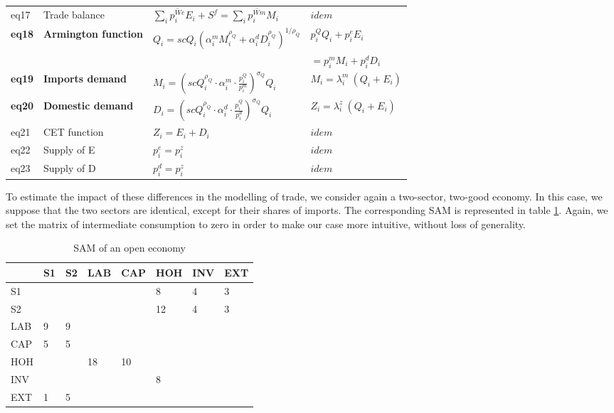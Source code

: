 \begin{table}[!h]
\begin{tabular}{llll}
		eq17 & Trade balance & $\sum_i \overline{p^{We}_i} E_i + S^f = \sum_i \overline{p^{Wm}_i} M_i$ & $idem$ \\
		\textbf{eq18} & \textbf{Armington function} & $Q_i = scQ_i (\alpha^m_i M_i^{\rho_Q} + \alpha^d_i D_i^{\rho_Q}  )^{1/\rho_Q} $ &  $p_i^Q Q_i + p_i^e E_i $ \\
		  &  &   &  $= p^m_i M_i + p^d_i D_i$ \\
		\textbf{eq19} & \textbf{Imports demand} & $M_i = \left( scQ_i^{\rho_Q} \cdot \alpha_i^m \cdot \frac{p_i^Q}{p_i^m} \right)^{\sigma_Q} Q_i$ & $M_i=\lambda^m_i ~ (Q_i+E_i)$\\
		\textbf{eq20}  & \textbf{Domestic demand} & $D_i = \left( scQ_i^{\rho_Q} \cdot \alpha_i^d \cdot \frac{p_i^Q}{p_i^d} \right)^{\sigma_Q} Q_i$ & $Z_i=\lambda^z_i ~ (Q_i+E_i)$\\
		eq21 & CET function & $Z_i = E_i + D_i$ & $idem$ \\
		eq22 & Supply of E & $p_i^e = p_i^z $ & $idem$ \\
		eq23 & Supply of D & $p_i^d = p_i^z  $ & $idem$ \\
		\bottomrule
	\end{tabular}
\end{table}

To estimate the impact of these differences in the modelling of trade, we consider again a two-sector, two-good economy. In this case, we suppose that the two sectors are identical, except for their shares of imports. The corresponding SAM is represented in table \ref{tab:openEconomy}.
Again, we set the matrix of intermediate consumption to zero in order to make our case more intuitive, without loss of generality.

\begin{table}[!h]
	\centering
	\caption{SAM of an open economy}
	\label{tab:openEconomy}
	\begin{tabular}{llllllll}
		\toprule
		& S1 & S2 & LAB & CAP & HOH & INV & EXT \\
		\midrule
		S1 &  &  &  &  & 8 & 4 & 3 \\
		S2 &  &  &  &  & 12 & 4 & 3 \\
		LAB & 9 & 9 &  &  &  &  &  \\
		CAP & 5 & 5 &  &  &  &  &  \\
		HOH &  &  & 18 & 10 &  &  &  \\
		INV &  &  &  &  & 8 &  &  \\
		EXT & 1 & 5 &  &  &  &  &  \\
		\bottomrule
	\end{tabular}
\end{table}

